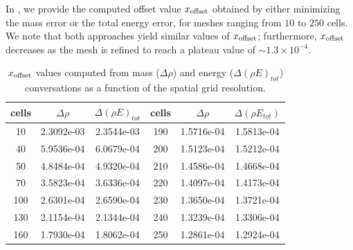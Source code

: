 \documentclass[times,doublespace]{fldauth}%
\begin{document}
In , we provide the computed offset value $x_{\text{\text{offset}}}$ obtained by either minimizing the mass error
or the total energy error, for meshes ranging from $10$ to $250$ cells.
We note that both approaches yield similar values of $x_{\text{\text{offset}}}$; furthermore, $x_{\text{\text{offset}}}$ decreases as the mesh is refined to reach a plateau value of $\sim 1.3 \times 10^{-4}$.
%
\begin{table}[h]
\begin{center}
\begin{tabular}{ |c|c|c||c|c|c| }
\hline
 cells & $\Delta \rho$ & $\Delta (\rho E)_{tot}$ &  cells & $\Delta \rho$ & $\Delta (\rho E_{tot})$ \\ \hline
10 & 2.3092e-03 & 2.3544e-03 & 190 & 1.5716e-04 & 1.5813e-04 \\ \hline
40 & 5.9536e-04 & 6.0679e-04 & 200 & 1.5123e-04 & 1.5212e-04 \\ \hline
50 & 4.8484e-04 & 4.9320e-04 & 210 & 1.4586e-04 & 1.4668e-04 \\ \hline
70 & 3.5823e-04 & 3.6336e-04 & 220 & 1.4097e-04 & 1.4173e-04 \\ \hline
100 & 2.6301e-04 & 2.6590e-04 & 230 & 1.3650e-04 & 1.3721e-04 \\ \hline
130 & 2.1154e-04 & 2.1344e-04 & 240 & 1.3239e-04 & 1.3306e-04 \\ \hline
160 & 1.7930e-04 & 1.8062e-04 & 250 & 1.2861e-04 & 1.2924e-04 \\ \hline
\end{tabular}
\end{center}
\caption{$x_{\text{\text{offset}}}$ values computed from mass ($\Delta \rho$) and energy ($\Delta (\rho E)_{tot}$) conversations as a function of the spatial grid resolution.}\label{tbl:mach-1p05-x-offset}
\end{table}
\end{document}
